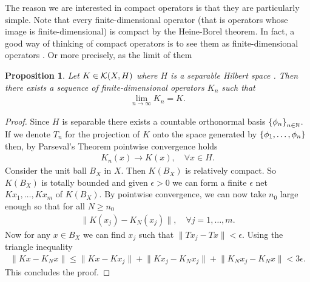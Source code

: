 \documentclass[12pt]{article}
\newtheorem{proposition}{Proposition}
\renewcommand{\norm}[1]{\lVert #1 \rVert}\renewcommand{\abs}[1]{\left| #1 \right|}
\begin{document}
\begin{CJK*}{UTF8}{gbsn}
  The reason we are interested in compact operators is that they are particularly simple.
  Note that every finite-dimensional operator (that is operators whose image is finite-dimensional) is compact by the Heine-Borel theorem. In fact, a good way of thinking of compact operators is to see them as finite-dimensional operators . Or more precisely,
	as the limit of them
	\begin{proposition}
		Let $K \in  \mathcal{K}(X,H)$ where $H$ is a separable Hilbert space . Then there exists a sequence of finite-dimensional operators $K_n$ such that
		\begin{align*}
			\lim_{n \to \infty}K_n=K.
		\end{align*}
	\end{proposition}
	\begin{proof}
		Since $H$ is separable there exists a countable orthonormal basis $\left\{\phi_n\right\}_{n \in \mathbb{N}}$. If we denote $T_n$ for the projection of $K$ onto the space generated by  $\left\{\phi_1,\ldots,\phi_n\right\} $ then, by Parseval's Theorem pointwise convergence holds
		\begin{align*}
			K_n(x) \to K(x) , \quad\forall x \in  H.
		\end{align*}
		Consider the unit ball $B_X$ in  $X$. Then  $K(B_X)$ is relatively compact. So $K(B_X)$  is totally bounded and given $\epsilon >0$ we can form a finite $\epsilon $ net $Kx_1,\ldots,Kx_m $ of $K(B_X)$. By pointwise convergence, we can now take $n_0$ large enough so that for all $N \geq n_0$
		\begin{align*}
			\norm{K(x_j)-K_N(x_j)} , \quad\forall j=1,\ldots,m.
		\end{align*}
		Now for any  $x\in B_X $ we can find $x_j$ such that  $\norm{Tx_j-Tx}< \epsilon $. Using the triangle inequality
		\begin{align*}
			\norm{Kx-K_N x} \leq \norm{Kx-K x_j}+ \norm{K x_j-K_N x_{j}}+ \norm{K_N x_j-K_N x} < 3\epsilon .
		\end{align*}
		This concludes the proof.
	\end{proof}
	

\end{CJK*}
\end{document}
